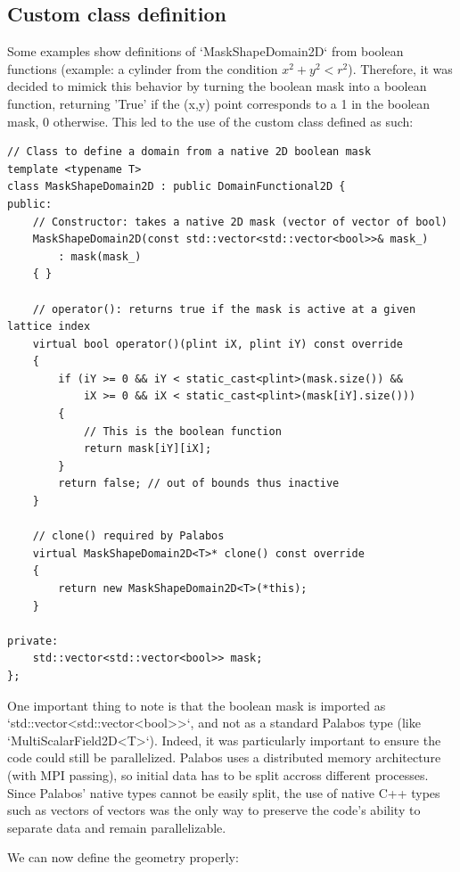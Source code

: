 \documentclass{article}
\begin{document}
\subsection{Custom class definition}
Some examples show definitions of `MaskShapeDomain2D` from boolean functions (example: a cylinder from the condition $x^2+y^2<r^2$). Therefore, it was decided to mimick this behavior by turning the boolean mask into a boolean function, returning 'True' if the (x,y) point corresponds to a 1 in the boolean mask, 0 otherwise. This led to the use of the custom class defined as such:
\begin{verbatim}
// Class to define a domain from a native 2D boolean mask
template <typename T>
class MaskShapeDomain2D : public DomainFunctional2D {
public:
    // Constructor: takes a native 2D mask (vector of vector of bool)
    MaskShapeDomain2D(const std::vector<std::vector<bool>>& mask_)
        : mask(mask_)
    { }

    // operator(): returns true if the mask is active at a given lattice index 
    virtual bool operator()(plint iX, plint iY) const override
    {
        if (iY >= 0 && iY < static_cast<plint>(mask.size()) &&
            iX >= 0 && iX < static_cast<plint>(mask[iY].size()))
        {
            // This is the boolean function
            return mask[iY][iX];
        }
        return false; // out of bounds thus inactive
    }

    // clone() required by Palabos
    virtual MaskShapeDomain2D<T>* clone() const override
    {
        return new MaskShapeDomain2D<T>(*this);
    }

private:
    std::vector<std::vector<bool>> mask;
};
\end{verbatim}

One important thing to note is that the boolean mask is imported as `std::vector\textless std::vector\textless bool\textgreater\textgreater`, and not as a standard Palabos type (like `MultiScalarField2D\textless T\textgreater`). Indeed, it was particularly important to ensure the code could still be parallelized. Palabos uses a distributed memory architecture (with MPI passing), so initial data has to be split accross different processes. Since Palabos' native types cannot be easily split, the use of native C++ types such as vectors of vectors was the only way to preserve the code's ability to separate data and remain parallelizable.

We can now define the geometry properly:
\end{document}
